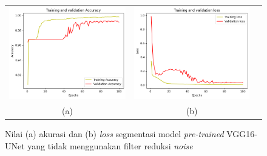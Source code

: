 \begin{enumerate}
	
	\begin{figure}[htbp]
		\centering
		\begin{tabular}{ccc}
			\includegraphics[scale=0.5]{bab4/acc-ori-vggunet.png} &
			\includegraphics[scale=0.5]{bab4/loss-ori-vggunet.png} & \\
			(a) & (b)    %
		\end{tabular}
		\caption{Nilai (a) akurasi dan (b) \textit{loss} segmentasi model \textit{pre-trained} VGG16-UNet yang tidak menggunakan filter reduksi \textit{noise}}
		\label{fig:performance-ori-vggunet}
	\end{figure}
	

\end{enumerate}

